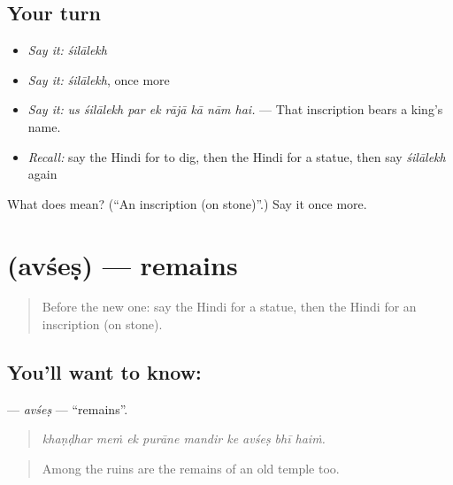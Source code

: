\subsection*{Your turn}
\begin{itemize}
\raggedright
  \item \emph{Say it:} \emph{śilālekh}
  \item \emph{Say it:} \emph{śilālekh}, once more
  \item \emph{Say it:} \emph{us śilālekh par ek rājā kā nām hai.} — That inscription bears a king's name.
  \item \emph{Recall:} say the Hindi for to dig, then the Hindi for a statue, then say \emph{śilālekh} again
\end{itemize}

\begin{tcolorbox}[breakable,colback=teal!4,colframe=teal!35!black,title={Before you move on}]
What does  mean? (\textquotedblleft{}An inscription (on stone)\textquotedblright{}.) Say it once more.
\end{tcolorbox}
\section[\texorpdfstring{\hi{अवशेष} (avśeṣ)}{अवशेष (avśeṣ)}]{ (avśeṣ) — remains}

\label{lesson:HI-C326-avses}



\begin{quote}
Before the new one: say the Hindi for a statue, then the Hindi for an inscription (on stone).
\end{quote}

\subsection*{You'll want to know: }
\textbf{} — \emph{avśeṣ} — \textquotedblleft{}remains\textquotedblright{}.

\begin{quote}
        
\end{quote}

\begin{quote}
\emph{khaṇḍhar meṁ ek purāne mandir ke avśeṣ bhī haiṁ.}
\end{quote}

\begin{quote}
Among the ruins are the remains of an old temple too.
\end{quote}

